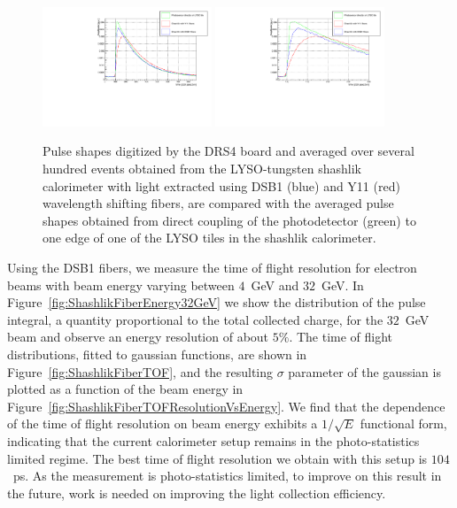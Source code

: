 \documentclass[12pt]{article}
\begin{document}
\begin{figure}[H] \centering
\includegraphics[width=0.45\textwidth]{figs/FiberPulses} 
\includegraphics[width=0.45\textwidth]{figs/FiberPulsesZoom} 
\caption{ Pulse shapes digitized by the DRS4 board and averaged over several hundred events 
obtained from the LYSO-tungsten shashlik calorimeter with light extracted using
DSB1 (blue) and Y11 (red) wavelength shifting fibers, are compared with 
the averaged pulse shapes obtained from direct coupling of the photodetector (green)
to one edge of one of the LYSO tiles in the shashlik calorimeter.} 
\label{fig:FiberPulseComparison}
\end{figure}


Using the DSB1 fibers, we measure the time of flight resolution
for electron beams with beam energy varying between $4$~GeV and $32$~GeV.
In Figure~\ref{fig:ShashlikFiberEnergy32GeV} we show the distribution
of the pulse integral, a quantity proportional to the total collected charge,
for the $32$~GeV beam and observe an energy resolution of about $5\%$.
The time of flight distributions, fitted to gaussian functions,
are shown in Figure~\ref{fig:ShashlikFiberTOF}, and the resulting
$\sigma$ parameter of the gaussian is plotted as a function of the
beam energy in Figure~\ref{fig:ShashlikFiberTOFResolutionVsEnergy}.
We find that the dependence of the time of flight resolution on
beam energy exhibits a $1/\sqrt{E}$ functional form, indicating
that the current calorimeter setup remains in the photo-statistics
limited regime. The best time of flight resolution we obtain
with this setup is $104$~ps. As the measurement is photo-statistics
limited, to improve on this result in the future, work is needed
on improving the light collection efficiency. 
\end{document}

